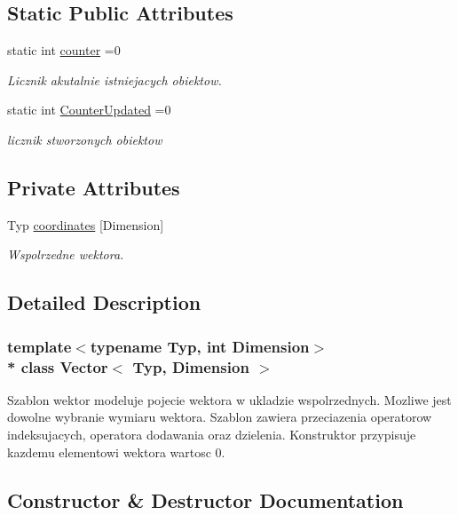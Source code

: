 \subsection*{Static Public Attributes}
\begin{DoxyCompactItemize}
\item 
static int \hyperlink{class_vector_add70f47687018cd95d2486bd479f131a}{counter} =0
\begin{DoxyCompactList}\small\item\em Licznik akutalnie istniejacych obiektow. \end{DoxyCompactList}\item 
static int \hyperlink{class_vector_a7c6fa150970fc507368e0d06f9626194}{Counter\+Updated} =0
\begin{DoxyCompactList}\small\item\em licznik stworzonych obiektow \end{DoxyCompactList}\end{DoxyCompactItemize}
\subsection*{Private Attributes}
\begin{DoxyCompactItemize}
\item 
Typ \hyperlink{class_vector_a4696b907a043a0cf7feb8ef74efaee97}{coordinates} \mbox{[}Dimension\mbox{]}
\begin{DoxyCompactList}\small\item\em Wspolrzedne wektora. \end{DoxyCompactList}\end{DoxyCompactItemize}


\subsection{Detailed Description}
\subsubsection*{template$<$typename Typ, int Dimension$>$\\*
class Vector$<$ Typ, Dimension $>$}

Szablon wektor modeluje pojecie wektora w ukladzie wspolrzednych. Mozliwe jest dowolne wybranie wymiaru wektora. Szablon zawiera przeciazenia operatorow indeksujacych, operatora dodawania oraz dzielenia. Konstruktor przypisuje kazdemu elementowi wektora wartosc 0. 

\subsection{Constructor \& Destructor Documentation}
